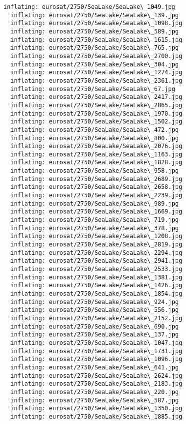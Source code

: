\documentclass[11pt]{article}
\begin{document}
\begin{Verbatim}[commandchars=\\\{\}]
  inflating: eurosat/2750/SeaLake/SeaLake\_1049.jpg
  inflating: eurosat/2750/SeaLake/SeaLake\_139.jpg
  inflating: eurosat/2750/SeaLake/SeaLake\_1098.jpg
  inflating: eurosat/2750/SeaLake/SeaLake\_589.jpg
  inflating: eurosat/2750/SeaLake/SeaLake\_1615.jpg
  inflating: eurosat/2750/SeaLake/SeaLake\_765.jpg
  inflating: eurosat/2750/SeaLake/SeaLake\_2700.jpg
  inflating: eurosat/2750/SeaLake/SeaLake\_304.jpg
  inflating: eurosat/2750/SeaLake/SeaLake\_1274.jpg
  inflating: eurosat/2750/SeaLake/SeaLake\_2361.jpg
  inflating: eurosat/2750/SeaLake/SeaLake\_67.jpg
  inflating: eurosat/2750/SeaLake/SeaLake\_2417.jpg
  inflating: eurosat/2750/SeaLake/SeaLake\_2865.jpg
  inflating: eurosat/2750/SeaLake/SeaLake\_1970.jpg
  inflating: eurosat/2750/SeaLake/SeaLake\_1502.jpg
  inflating: eurosat/2750/SeaLake/SeaLake\_472.jpg
  inflating: eurosat/2750/SeaLake/SeaLake\_800.jpg
  inflating: eurosat/2750/SeaLake/SeaLake\_2076.jpg
  inflating: eurosat/2750/SeaLake/SeaLake\_1163.jpg
  inflating: eurosat/2750/SeaLake/SeaLake\_1828.jpg
  inflating: eurosat/2750/SeaLake/SeaLake\_958.jpg
  inflating: eurosat/2750/SeaLake/SeaLake\_2689.jpg
  inflating: eurosat/2750/SeaLake/SeaLake\_2658.jpg
  inflating: eurosat/2750/SeaLake/SeaLake\_2239.jpg
  inflating: eurosat/2750/SeaLake/SeaLake\_989.jpg
  inflating: eurosat/2750/SeaLake/SeaLake\_1669.jpg
  inflating: eurosat/2750/SeaLake/SeaLake\_719.jpg
  inflating: eurosat/2750/SeaLake/SeaLake\_378.jpg
  inflating: eurosat/2750/SeaLake/SeaLake\_1208.jpg
  inflating: eurosat/2750/SeaLake/SeaLake\_2819.jpg
  inflating: eurosat/2750/SeaLake/SeaLake\_2294.jpg
  inflating: eurosat/2750/SeaLake/SeaLake\_2941.jpg
  inflating: eurosat/2750/SeaLake/SeaLake\_2533.jpg
  inflating: eurosat/2750/SeaLake/SeaLake\_1381.jpg
  inflating: eurosat/2750/SeaLake/SeaLake\_1426.jpg
  inflating: eurosat/2750/SeaLake/SeaLake\_1854.jpg
  inflating: eurosat/2750/SeaLake/SeaLake\_924.jpg
  inflating: eurosat/2750/SeaLake/SeaLake\_556.jpg
  inflating: eurosat/2750/SeaLake/SeaLake\_2152.jpg
  inflating: eurosat/2750/SeaLake/SeaLake\_690.jpg
  inflating: eurosat/2750/SeaLake/SeaLake\_137.jpg
  inflating: eurosat/2750/SeaLake/SeaLake\_1047.jpg
  inflating: eurosat/2750/SeaLake/SeaLake\_1731.jpg
  inflating: eurosat/2750/SeaLake/SeaLake\_1096.jpg
  inflating: eurosat/2750/SeaLake/SeaLake\_641.jpg
  inflating: eurosat/2750/SeaLake/SeaLake\_2624.jpg
  inflating: eurosat/2750/SeaLake/SeaLake\_2183.jpg
  inflating: eurosat/2750/SeaLake/SeaLake\_220.jpg
  inflating: eurosat/2750/SeaLake/SeaLake\_587.jpg
  inflating: eurosat/2750/SeaLake/SeaLake\_1350.jpg
  inflating: eurosat/2750/SeaLake/SeaLake\_1885.jpg

\end{Verbatim}
\end{document}

